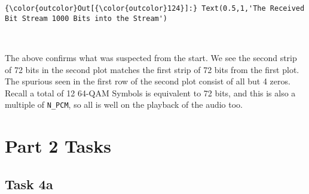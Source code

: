 \documentclass[11pt]{article}
\begin{document}
\begin{Verbatim}[commandchars=\\\{\}]
{\color{outcolor}Out[{\color{outcolor}124}]:} Text(0.5,1,'The Received Bit Stream 1000 Bits into the Stream')
\end{Verbatim}
            
    \begin{center}
    \end{center}
    { \hspace*{\fill} \\}
    
    The above confirms what was suspected from the start. We see the second
strip of 72 bits in the second plot matches the first strip of 72 bits
from the first plot. The spurious seen in the first row of the second
plot consist of all but 4 zeros. Recall a total of 12 64-QAM Symbols is
equivalent to 72 bits, and this is also a multiple of \texttt{N\_PCM},
so all is well on the playback of the audio too.

    \section{Part 2 Tasks}\label{part-2-tasks}

    \subsection{Task 4a}\label{task-4a}
\end{document}
